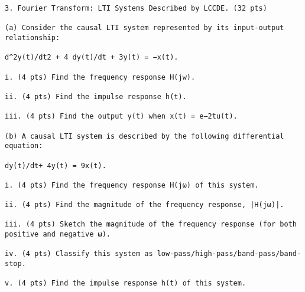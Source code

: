 \documentclass[11pt,addpoints]{exam}
\begin{document}
\begin{verbatim}
3. Fourier Transform: LTI Systems Described by LCCDE. (32 pts)

(a) Consider the causal LTI system represented by its input-output relationship:

d^2y(t)/dt2 + 4 dy(t)/dt + 3y(t) = −x(t).

i. (4 pts) Find the frequency response H(jw).

ii. (4 pts) Find the impulse response h(t).

iii. (4 pts) Find the output y(t) when x(t) = e−2tu(t).

(b) A causal LTI system is described by the following differential equation:

dy(t)/dt+ 4y(t) = 9x(t).

i. (4 pts) Find the frequency response H(jω) of this system.

ii. (4 pts) Find the magnitude of the frequency response, |H(jω)|.

iii. (4 pts) Sketch the magnitude of the frequency response (for both positive and negative ω).

iv. (4 pts) Classify this system as low-pass/high-pass/band-pass/band-stop.

v. (4 pts) Find the impulse response h(t) of this system.






\end{verbatim}
\end{document}
